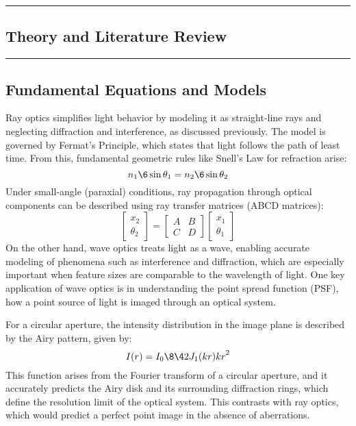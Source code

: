 {\color{gray}\hrule}
\begin{center}
\section{Theory and Literature Review}
\bigskip
\end{center}
{\color{gray}\hrule}
\begin{multicols}{2}
\subsection{Fundamental Equations and Models}
Ray optics simplifies light behavior by modeling it as straight-line rays and neglecting diffraction and interference,
as discussed previously. The model is governed by Fermat's Principle, which states that light follows the path of least time.
From this, fundamental geometric rules like Snell's Law for refraction arise: 
\[
n_1\6\sin{\theta_1} = n_2\6\sin{\theta_2}
\]
Under small-angle (paraxial) conditions, ray propagation through optical components can be described using ray transfer matrices (ABCD matrices): \[
\begin{bmatrix}
x_2 \\ \theta_2
\end{bmatrix} = \begin{bmatrix} A & B \\ C & D \end{bmatrix} \begin{bmatrix} x_1 \\ \theta_1 \end{bmatrix} 
\]
On the other hand, wave optics treats light as a wave, enabling accurate modeling of phenomena such as interference and diffraction,
which are especially important when feature sizes are comparable to the wavelength of light. 
One key application of wave optics is in understanding the point spread function (PSF), 
how a point source of light is imaged through an optical system.

For a circular aperture, the intensity distribution in the image plane is described by the Airy pattern, given by:
\[ 
I(r) = I_0\8{\4{2J_1(kr)}{kr}}^2
\]
This function arises from the Fourier transform of a circular aperture, and it accurately predicts the Airy disk and its 
surrounding diffraction rings, which define the resolution limit of the optical system. This contrasts with ray optics,
which would predict a perfect point image in the absence of aberrations.


\end{multicols}
